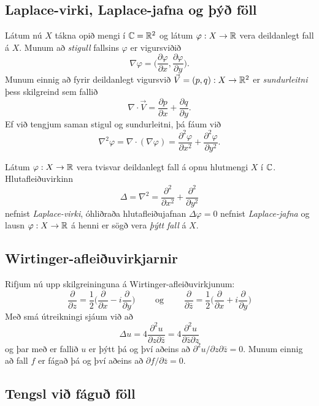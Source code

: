 \subsection*{Laplace-virki, Laplace-jafna og þýð föll }

Látum nú $X$ tákna opið mengi í ${\mathbb C}={\mathbb R}^2$ og látum $\varphi:X\to {\mathbb R}$
vera deildanlegt fall á $X$. Munum að {\it stigull} fallsins
$\varphi$  er vigursviðið 
$$
\nabla \varphi=\big(\dfrac{\partial \varphi}{\partial x},
\dfrac{\partial \varphi}{\partial y}\big).
$$
Munum einnig að fyrir deildanlegt vigursvið  $\vec V=(p,q):X\to {\mathbb R}^ 2$ er 
{\it sundurleitni} þess skilgreind sem fallið
$$
\nabla\cdot \vec V=\dfrac{\partial p}{\partial x}+\dfrac{\partial
q}{\partial y}.
$$
Ef við tengjum saman stigul og sundurleitni, þá fáum við  
$$
\nabla^2\varphi=\nabla\cdot (\nabla \varphi)= \dfrac {\partial^2 \varphi}{\partial x^2}+  
\dfrac {\partial^2 \varphi}{\partial y^2}.  
$$

\begin{sk} Látum  $\varphi:X\to {\mathbb R}$ vera tvisvar deildanlegt fall 
á opnu hlutmengi $X$ í ${\mathbb C}$.  Hlutafleiðuvirkinn
$$
{\Delta}=\nabla^2=\dfrac {\partial^2 }{\partial x^2}+  
\dfrac {\partial^2 }{\partial y^2}
$$
nefnist {\it Laplace-virki},
óhliðraða hlutafleiðujafnan
${\Delta}\varphi=0$ nefnist {\it
Laplace-jafna}
og lausn $\varphi:X\to {\mathbb R}$  á  henni er sögð vera {\it þýtt fall} á $X$.
\end{sk}

\subsection*{Wirtinger-afleiðuvirkjarnir}

Rifjum nú upp skilgreininguna á Wirtinger-afleiðuvirkjunum:
$$
\dfrac{\partial}{\partial z}=\dfrac 12\bigg(\dfrac{\partial }{\partial x}-i
\dfrac{\partial}{\partial y}\bigg)
\qquad \text{ og } \qquad 
\dfrac{\partial}{\partial \bar z}=\dfrac 12\bigg(\dfrac{\partial
}{\partial x}+i \dfrac{\partial}{\partial y}\bigg)
$$
Með smá útreikningi sjáum við að
$$
\Delta u=4\dfrac{\partial^2 u}{\partial z\partial \bar z}
=4\dfrac{\partial^2 u}{\partial \bar z\partial z}
$$
og þar með er fallið $u$ er þýtt þá og því aðeins að
$\partial^2 u/\partial z\partial\bar z =0$.  Munum einnig að fall $f$
er fágað þá og því aðeins að $\partial f/\partial \bar z=0$.


\subsection*{Tengsl við fáguð föll}

